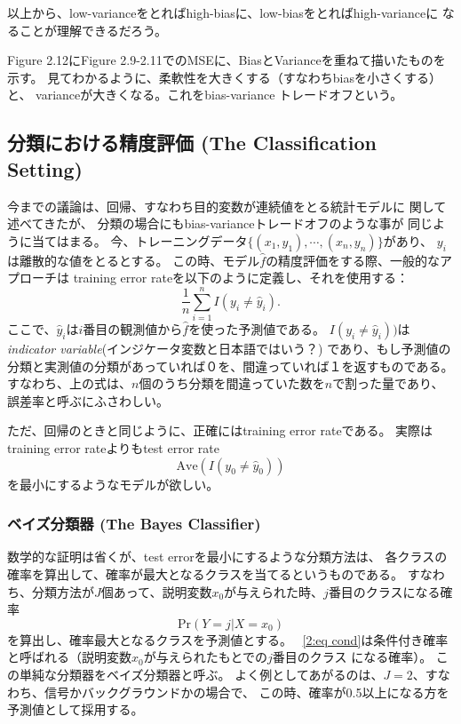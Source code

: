 \documentclass{jsbook}
\begin{document}
以上から、low-varianceをとればhigh-biasに、low-biasをとればhigh-varianceに
なることが理解できるだろう。

Figure 2.12にFigure 2.9-2.11でのMSEに、BiasとVarianceを重ねて描いたものを示す。
見てわかるように、柔軟性を大きくする（すなわちbiasを小さくする）と、
varianceが大きくなる。これをbias-variance トレードオフという。

\subsection{分類における精度評価 (The Classification Setting)}
今までの議論は、回帰、すなわち目的変数が連続値をとる統計モデルに
関して述べてきたが、
分類の場合にもbias-varianceトレードオフのような事が
同じように当てはまる。
今、トレーニングデータ$\{(x_1, y_1), \cdots, (x_n, y_n)\}$があり、
$y_i$は離散的な値をとるとする。
この時、モデル$\hat{f}$の精度評価をする際、一般的なアプローチは
training error rateを以下のように定義し、それを使用する：
\begin{equation}
	\frac{1}{n}\sum_{i=1}^n I(y_i \neq \hat{y}_i).
\end{equation}
ここで、$\hat{y}_i$は$i$番目の観測値から$\hat{f}$を使った予測値である。
$I(y_i \neq \hat{y}_i))$は {\textit{indicator variable}}(インジケータ変数と日本語ではいう？)
であり、もし予測値の分類と実測値の分類があっていれば０を、間違っていれば１を返すものである。
すなわち、上の式は、$n$個のうち分類を間違っていた数を$n$で割った量であり、
誤差率と呼ぶにふさわしい。

ただ、回帰のときと同じように、正確にはtraining error rateである。
実際はtraining error rateよりもtest error rate
\begin{equation}
	\text{Ave}(I(y_0 \neq \hat{y}_0))
\end{equation}
を最小にするようなモデルが欲しい。

\subsubsection{ベイズ分類器 (The Bayes Classifier)}
数学的な証明は省くが、test errorを最小にするような分類方法は、
各クラスの確率を算出して、確率が最大となるクラスを当てるというものである。
すなわち、分類方法が$J$個あって、説明変数$x_0$が与えられた時、$j$番目のクラスになる確率
\begin{equation}
	\text{Pr}(Y = j | X = x_0) \label{2:eq cond}
\end{equation}
を算出し、確率最大となるクラスを予測値とする。
~\eqref{2:eq cond}は条件付き確率と呼ばれる（説明変数$x_0$が与えられたもとでの$j$番目のクラス
になる確率）。
この単純な分類器をベイズ分類器と呼ぶ。
よく例としてあがるのは、$J=2$、すなわち、信号かバックグラウンドかの場合で、
この時、確率が0.5以上になる方を予測値として採用する。
\end{document}
